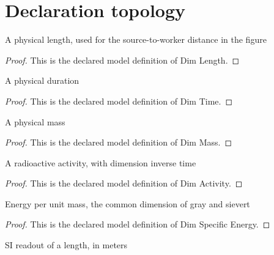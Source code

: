 \section{Declaration topology}
\begin{definition}
  \label{def:physics:phyx-mini-0619:phyxmini0619-dimlength}
  A physical length, used for the source-to-worker distance in the figure
\end{definition}
\begin{proof}
  This is the declared model definition of Dim Length.
\end{proof}
\begin{definition}
  \label{def:physics:phyx-mini-0619:phyxmini0619-dimtime}
  A physical duration
\end{definition}
\begin{proof}
  This is the declared model definition of Dim Time.
\end{proof}
\begin{definition}
  \label{def:physics:phyx-mini-0619:phyxmini0619-dimmass}
  A physical mass
\end{definition}
\begin{proof}
  This is the declared model definition of Dim Mass.
\end{proof}
\begin{definition}
  \label{def:physics:phyx-mini-0619:phyxmini0619-dimactivity}
  A radioactive activity, with dimension inverse time
\end{definition}
\begin{proof}
  This is the declared model definition of Dim Activity.
\end{proof}
\begin{definition}
  \label{def:physics:phyx-mini-0619:phyxmini0619-dimspecificenergy}
  Energy per unit mass, the common dimension of gray and sievert
\end{definition}
\begin{proof}
  This is the declared model definition of Dim Specific Energy.
\end{proof}
\begin{definition}
  \label{def:physics:phyx-mini-0619:phyxmini0619-lengthinmeters}
  SI readout of a length, in meters
\end{definition}
